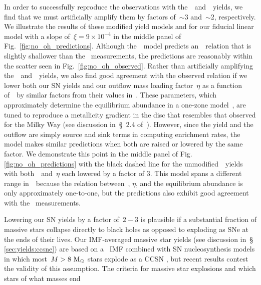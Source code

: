 \documentclass[ms.tex]{subfiles}
\begin{document}
In order to successfully reproduce the observations with
the~\cristallo~and~\ventura~yields, we find that we must artificially amplify
them by factors of~$\sim$3 and~$\sim$2, respectively.
We illustrate the results of these modified yield models and for our fiducial
linear model with a slope of~$\xi = 9\times10^{-4}$ in the middle panel
of Fig.~\ref{fig:no_oh_predictions}.
Although the~\ventura~model predicts an~\ohno~relation that is slightly
shallower than the~\citet{Dopita2016} measurements, the predictions are
reasonably within the scatter seen in Fig.~\ref{fig:no_oh_observed}.
Rather than artificially amplifying the~\cristallo~and~\ventura~yields, we also
find good agreement with the observed relation if we lower both our SN yields
and our outflow mass loading factor~$\eta$ as a function of~\rgal~by similar
factors from their values in~\citet{Johnson2021}.
These parameters, which approximately determine the equilibrium abundance in a
one-zone model~\citep{Weinberg2017}, are tuned to reproduce a metallicity
gradient in the disc that resembles that observed for the Milky Way (see
discussion in~\S~2.4 of~\citealp{Johnson2021}).
However, since the yield and the outflow are simply source and sink terms in
computing enrichment rates, the model makes similar predictions when both are
raised or lowered by the same factor.
We demonstrate this point in the middle panel of Fig.
\ref{fig:no_oh_predictions} with the black dashed line for the
unmodified~\cristallo~yields with both~~and~$\eta$ each lowered by a
factor of 3.
This model spans a different range in~\oh~because the relation between~,
$\eta$, and the equilibrium abundance is only approximately one-to-one, but the
predictions also exhibit good agreement with the~\citet{Dopita2016}
measurements.
\par
Lowering our SN yields by a factor of~$2 - 3$ is plausible if a substantial
fraction of massive stars collapse directly to black holes as opposed to
exploding as SNe at the ends of their lives.
Our IMF-averaged massive star yields (see discussion in~\S
\ref{sec:yields:ccsne}) are based on a~\citet{Kroupa2001} IMF combined with SN
nucleosynthesis models in which most~$M > 8~\text{M}_\odot$ stars explode as a CCSN
\cite[e.g.][]{Woosley1995, Chieffi2004, Chieffi2013, Limongi2018, Nomoto2013},
but recent results contest the validity of this assumption.
The criteria for massive star explosions and which stars of what masses end
\end{document}

